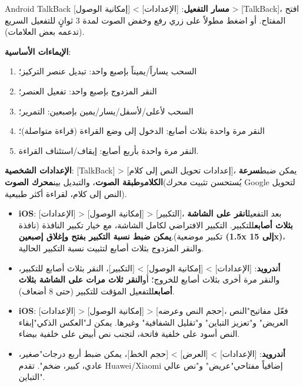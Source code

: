 \begin{tcbinfo}{Android TalkBack}
\textbf{مسار التفعيل}: [الإعدادات] > [إمكانية الوصول] > [TalkBack]، افتح المفتاح. أو اضغط مطولاً على زري رفع وخفض الصوت لمدة 3 ثوانٍ للتفعيل السريع (تدعمه بعض العلامات).

\textbf{الإيماءات الأساسية}:

\begin{enumerate}
  \item السحب يساراً/يميناً بإصبع واحد: تبديل عنصر التركيز؛
  \item النقر المزدوج بإصبع واحد: تفعيل العنصر؛
  \item السحب لأعلى/لأسفل/يسار/يمين بإصبعين: التمرير؛
  \item النقر مرة واحدة بثلاث أصابع: الدخول إلى وضع القراءة (قراءة متواصلة)؛
  \item النقر مرة واحدة بأربع أصابع: إيقاف/استئناف القراءة.
\end{enumerate}

\textbf{الإعدادات الشخصية}: [TalkBack] > [إعدادات تحويل النص إلى كلام]، يمكن ضبط\textbf{سرعة الكلام}و\textbf{طبقة الصوت}، والتبديل بين\textbf{محرك الصوت}(يُستحسن تثبيت محرك Google لتحويل النص إلى كلام، لقراءة أكثر طبيعية).

\end{tcbinfo}



\begin{itemize}
  \item \textbf{iOS}: [الإعدادات] > [إمكانية الوصول] > [التكبير]، بعد التفعيل\textbf{انقر على الشاشة بثلاث أصابع}للتكبير. التكبير الافتراضي لكامل الشاشة، مع خيار تكبير النافذة (نافذة تكبير موضعية).\textbf{يمكن ضبط نسبة التكبير بفتح وإغلاق إصبعين (1.5x إلى 15x)}، والنقر المزدوج بثلاث أصابع لتثبيت نسبة التكبير الحالية.
  \item \textbf{أندرويد}: [الإعدادات] > [إمكانية الوصول] > [التكبير]، النقر بثلاث أصابع للتكبير، والنقر مرة أخرى بثلاث أصابع للخروج؛ أو\textbf{النقر ثلاث مرات على الشاشة بثلاث أصابع}للتفعيل المؤقت للتكبير (حتى 8 أضعاف).
\end{itemize}


\begin{itemize}
  \item \textbf{iOS}: [الإعدادات] > [إمكانية الوصول] > [حجم النص وعرضه]، فعّل مفاتيح"النص العريض" و"تعزيز التباين" و"تقليل الشفافية" وغيرها. يمكن لـ"العكس الذكي"إبقاء النص أسود على خلفية فاتحة، لتجنب نص أبيض على خلفية بيضاء.
  \item \textbf{أندرويد}: [الإعدادات] > [العرض] > [حجم الخط]، يمكن ضبط أربع درجات"صغير، عادي، كبير، ضخم". تقدم Huawei/Xiaomi إضافياً مفتاحي"عريض" و"نص عالي التباين".
\end{itemize}


